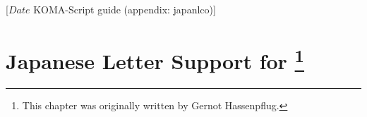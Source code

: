 %
%
%
%
%
%
%
%
% 
%
%
%
%
%
%

                 [$Date$
                  KOMA-Script guide (appendix: japanlco)]

\appendix

\chapter[{Japanese Letter Support for \Class{scrlttr2}}]
{Japanese Letter Support for \footnote{This chapter was
    originally written by Gernot Hassenpflug.}}

